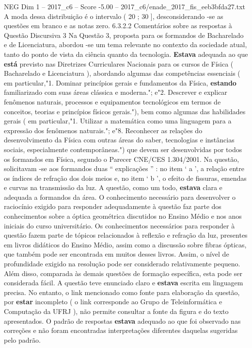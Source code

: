 \begin{textsample}{NEG Dim 1 – 2017\_c6 – Score -5.00 – 2017\_c6/enade\_2017\_fis\_eeb3bfda27.txt}
A moda dessa distribuição é o intervalo ( 20 ; 30 ], desconsiderando -se as questões em branco e as notas zero. 6.3.2.2 Comentários sobre as respostas à Questão Discursiva 3 Na Questão 3, proposta para os formandos de Bacharelado e de Licenciatura, abordou -se um tema relevante no contexto da sociedade atual, tanto do ponto de vista da ciência quanto da tecnologia. \textbf{Estava} adequada ao que \textbf{está} previsto nas Diretrizes Curriculares Nacionais para os cursos de Física ( Bacharelado e Licenciatura ), abordando algumas das competências essenciais ( em particular,"1.
Dominar princípios gerais e fundamentos da Física, \textbf{estando} familiarizado com suas áreas clássica e moderna."; e"2.
Descrever e explicar fenômenos naturais, processos e equipamentos tecnológicos em termos de conceitos, teorias e princípios físicos gerais."), bem como algumas das habilidades gerais ( em particular,"1.
Utilizar a matemática como uma linguagem para a expressão dos fenômenos naturais."; e"8.
Reconhecer as relações do desenvolvimento da Física com outras áreas do saber, tecnologias e instâncias sociais, especialmente contemporâneas.") que devem ser desenvolvidas por todos os formandos em Física, segundo o Parecer CNE/CES 1.304/2001.
Na questão, solicitavam -se aos formandos duas “ explicações ” : no item ‘ a ’, a relação entre os índices de refração dos dois meios e, no item ‘ b ’, o efeito de fissuras, emendas e curvas na transmissão da luz.
A questão, como um todo, \textbf{estava} clara e adequada a formandos da área.
O conhecimento necessário para desenvolver o raciocínio exigido para responder adequadamente à questão faz parte dos conhecimentos sobre a óptica geométrica discutidos no Ensino Médio e nos anos iniciais do curso universitário.
Os conhecimentos necessários para responder à questão fazem parte de tópicos relacionados à reflexão e refração da luz, presentes em livros didáticos do Ensino Médio, assim como a discussão sobre fibras ópticas, que também pode ser encontrada em muitos desses livros.
Assim, o nível de profundidade exigido na resolução pode ser considerado relativamente pequeno.
Além disso, comparada às demais questões de formação específica, esta pode ser considerada fácil.
A questão teve enunciado claro e \textbf{estava} escrita em linguagem precisa.
No entanto, o link mencionado como fonte para elaboração da questão, por \textbf{estar} incompleto ( o link corresponde ao Grupo de Teleinformática e Computação da UFRJ ), não permite consultar a fonte da figura e do texto apresentados.
O padrão de respostas \textbf{estava} adequado ao que foi observado nas correções e não foram encontradas interpretações diferentes daquelas sugeridas pelo padrão.

\end{textsample}
